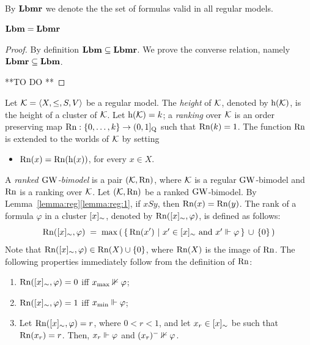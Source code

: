 By $\mathbf{Lbmr}$ we denote the  the set of formulas valid in all regular models.

\begin{lemma}
  $\mathbf{Lbm}=\mathbf{Lbmr}$
\end{lemma}

\begin{proof}
By definition $\mathbf{Lbm}\subseteq \mathbf{Lbmr}$. We prove the converse relation, namely  $\mathbf{Lbmr}\subseteq \mathbf{Lbm}$.

**TO DO **
\end{proof}


\noindent
Let $\mathcal{K}=\langle X,\leq,S,V \rangle$ be a regular model.
The \emph{height} of $\mathcal{K}$, denoted by $\mathrm{h}(\mathcal{K})$, is the height of a cluster of $\mathcal{K}$.
Let  $\mathrm{h}(\mathcal{K})=k$;  a \emph{ranking} over $\mathcal{K}$ is an order preserving map 
 $\mathrm{Rn} : \{0,\dots, k\} \to (0,1]_\mathrm{Q}$  such that  $\mathrm{Rn}(k) = 1$.
  The function $\mathrm{Rn}$ is extended to the worlds of $\mathcal{K}$ by setting
 \begin{itemize}
 \item $\mathrm{Rn}(x) = \mathrm{Rn}(\mathrm{h}(x))$, for every $x\in X$.
 \end{itemize}


\noindent
A \emph{ranked $\mbox{$\mathrm{GW}$}$-bimodel} is a pair $(\mathcal{K},\mathrm{Rn})$, where $\mathcal{K}$ is a regular
$\mbox{$\mathrm{GW}$}$-bimodel and $\mathrm{Rn}$ is a ranking over $\mathcal{K}$.
Let $(\mathcal{K},\mathrm{Rn})$ be a ranked $\mbox{$\mathrm{GW}$}$-bimodel.
By Lemma~\ref{lemma:reg}\ref{lemma:reg:1}, if  $ x S y$, then $\mathrm{Rn}(x)=\mathrm{Rn}(y)$.
The rank of a formula $\varphi$ in a cluster $[x]_\sim$, denoted by  $\mathrm{Rn}([x]_\sim,\varphi)$,
is defined as follows:
\[
\mathrm{Rn}([x]_\sim,\varphi) \;=\; \max\left(\,\{\,
  \mathrm{Rn}(x')~|~\mbox{$x' \in [x]_\sim$ and $x'\Vdash\varphi$} 
  \,\}\,\cup\,\{0\}\,\right)
\]
Note that $\mathrm{Rn}([x]_\sim,\varphi) \in \mathrm{Rn}(X)\cup\{0\}$, where $\mathrm{Rn}(X)$
is the image of $\mathrm{Rn}$.
The following properties immediately follow from the definition of $\mathrm{Rn}$:

 \begin{enumerate}[label=(P\arabic*), ref=(P\arabic*),leftmargin=*]

\item\label{prop:Rn:1}
  $\mathrm{Rn}([x]_\sim,\varphi)=0$  iff $x_{\mathrm{max}}\nVdash \varphi$;
\item\label{prop:Rn:2}
  $\mathrm{Rn}([x]_\sim,\varphi)=1$ iff $x_{\mathrm{min}}\Vdash \varphi$; 


\item\label{prop:Rn:3}
  Let $\mathrm{Rn}([x]_\sim,\varphi)=r$, where $0 < r < 1$, and let $x_r\in [x]_\sim$ be
  such that $\mathrm{Rn}(x_r) = r$. Then,
  $x_r\Vdash \varphi$ and  $(x_r)^-\nVdash \varphi$. 

  

\end{enumerate}

